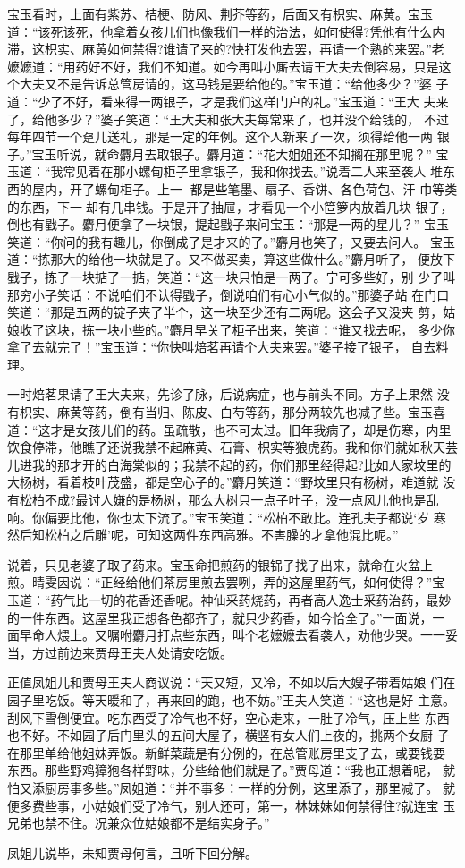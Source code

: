 宝玉看时，上面有紫苏、桔梗、防风、荆芥等药，后面又有枳实、麻黄。宝玉
道：“该死该死，他拿着女孩儿们也像我们一样的治法，如何使得?凭他有什么内
滞，这枳实、麻黄如何禁得?谁请了来的?快打发他去罢，再请一个熟的来罢。”老
嬷嬷道：“用药好不好，我们不知道。如今再叫小厮去请王大夫去倒容易，只是这
个大夫又不是告诉总管房请的，这马钱是要给他的。”宝玉道：“给他多少？”婆
子道：“少了不好，看来得一两银子，才是我们这样门户的礼。”宝玉道：“王大
夫来了，给他多少？”婆子笑道：“王大夫和张大夫每常来了，也并没个给钱的，
不过每年四节一个趸儿送礼，那是一定的年例。这个人新来了一次，须得给他一两
银子。”宝玉听说，就命麝月去取银子。麝月道：“花大姐姐还不知搁在那里呢？”
宝玉道：“我常见着在那小螺甸柜子里拿银子，我和你找去。”说着二人来至袭人
堆东西的屋内，开了螺甸柜子。上一 都是些笔墨、扇子、香饼、各色荷包、汗
巾等类的东西，下一却有几串钱。于是开了抽屉，才看见一个小笸箩内放着几块
银子，倒也有戥子。麝月便拿了一块银，提起戥子来问宝玉：“那是一两的星儿？”
宝玉笑道：“你问的我有趣儿，你倒成了是才来的了。”麝月也笑了，又要去问人。
宝玉道：“拣那大的给他一块就是了。又不做买卖，算这些做什么。”麝月听了，
便放下戥子，拣了一块掂了一掂，笑道：“这一块只怕是一两了。宁可多些好，别
少了叫那穷小子笑话：不说咱们不认得戥子，倒说咱们有心小气似的。”那婆子站
在门口笑道：“那是五两的锭子夹了半个，这一块至少还有二两呢。这会子又没夹
剪，姑娘收了这块，拣一块小些的。”麝月早关了柜子出来，笑道：“谁又找去呢，
多少你拿了去就完了！”宝玉道：“你快叫焙茗再请个大夫来罢。”婆子接了银子，
自去料理。

一时焙茗果请了王大夫来，先诊了脉，后说病症，也与前头不同。方子上果然
没有枳实、麻黄等药，倒有当归、陈皮、白芍等药，那分两较先也减了些。宝玉喜
道：“这才是女孩儿们的药。虽疏散，也不可太过。旧年我病了，却是伤寒，内里
饮食停滞，他瞧了还说我禁不起麻黄、石膏、枳实等狼虎药。我和你们就如秋天芸
儿进我的那才开的白海棠似的；我禁不起的药，你们那里经得起?比如人家坟里的
大杨树，看着枝叶茂盛，都是空心子的。”麝月笑道：“野坟里只有杨树，难道就
没有松柏不成?最讨人嫌的是杨树，那么大树只一点子叶子，没一点风儿他也是乱
响。你偏要比他，你也太下流了。”宝玉笑道：“松柏不敢比。连孔夫子都说‘岁
寒然后知松柏之后雕’呢，可知这两件东西高雅。不害臊的才拿他混比呢。”

说着，只见老婆子取了药来。宝玉命把煎药的银铞子找了出来，就命在火盆上
煎。晴雯因说：“正经给他们茶房里煎去罢咧，弄的这屋里药气，如何使得？”宝
玉道：“药气比一切的花香还香呢。神仙采药烧药，再者高人逸士采药治药，最妙
的一件东西。这屋里我正想各色都齐了，就只少药香，如今恰全了。”一面说，一
面早命人煨上。又嘱咐麝月打点些东西，叫个老嬷嬷去看袭人，劝他少哭。一一妥
当，方过前边来贾母王夫人处请安吃饭。

正值凤姐儿和贾母王夫人商议说：“天又短，又冷，不如以后大嫂子带着姑娘
们在园子里吃饭。等天暖和了，再来回的跑，也不妨。”王夫人笑道：“这也是好
主意。刮风下雪倒便宜。吃东西受了冷气也不好，空心走来，一肚子冷气，压上些
东西也不好。不如园子后门里头的五间大屋子，横竖有女人们上夜的，挑两个女厨
子在那里单给他姐妹弄饭。新鲜菜蔬是有分例的，在总管账房里支了去，或要钱要
东西。那些野鸡獐狍各样野味，分些给他们就是了。”贾母道：“我也正想着呢，
就怕又添厨房事多些。”凤姐道：“并不事多：一样的分例，这里添了，那里减了。
就便多费些事，小姑娘们受了冷气，别人还可，第一，林妹妹如何禁得住?就连宝
玉兄弟也禁不住。况兼众位姑娘都不是结实身子。”

凤姐儿说毕，未知贾母何言，且听下回分解。
